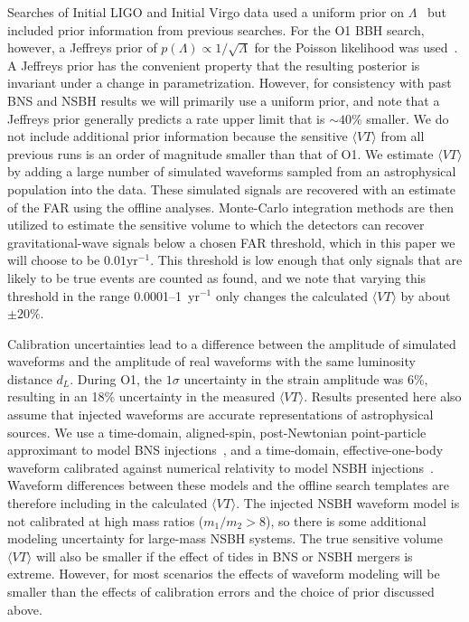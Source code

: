Searches of Initial \ac{LIGO} and Initial Virgo data used a uniform prior on
$\Lambda$~\citep{Colaboration:2011np} but included prior information from previous searches. 
For the \ac{O1} \ac{BBH} search, however, a Jeffreys prior of
$p(\Lambda) \propto 1/\sqrt{\Lambda}$ for the Poisson likelihood was used~\citep{Farr:2013yna,Abbott:2016nhf,TheLIGOScientific:2016pea}.
A Jeffreys prior has the convenient property that the resulting posterior is invariant under a change in parametrization. 
However, for consistency with past BNS and NSBH results we will primarily use a uniform prior, and note that a Jeffreys
prior generally predicts a rate upper limit that is $\sim 40$\% smaller. 
We do not include additional prior information because the sensitive $\langle VT \rangle$ from 
all previous runs is an order of magnitude smaller than that of \ac{O1}.
We estimate $\langle VT \rangle$ by adding a large number of
simulated waveforms sampled from an astrophysical population into the data. 
These simulated signals
are recovered with an estimate of the FAR using the offline analyses.
Monte-Carlo integration methods are then utilized to estimate
the sensitive volume to which the detectors can recover gravitational-wave signals
below a chosen FAR threshold, which in this paper we will choose to be $0.01 \mathrm{yr}^{-1}$.
This threshold is low enough that only signals that are likely to be true events are counted as found, and we 
note that varying this threshold in the range 0.0001--1~yr$^{-1}$ only changes the calculated $\langle VT \rangle$ 
by about $\pm 20\%$.

Calibration uncertainties lead to a difference between the amplitude of simulated
waveforms and the amplitude of real waveforms with the same luminosity distance $d_L$.
During \ac{O1}, the $1\sigma$ uncertainty in the strain amplitude was 6\%, resulting
in an 18\% uncertainty in the measured $\langle VT \rangle$. Results presented here
also assume that injected waveforms are accurate
representations of astrophysical sources. We use a time-domain, aligned-spin,
post-Newtonian point-particle approximant to model \ac{BNS}
injections~\citep{Buonanno:2009zt}, and a time-domain, effective-one-body waveform
calibrated against numerical relativity to model \ac{NSBH}
injections~\citep{Pan:2013rra,Taracchini:2013rva}. Waveform differences between these models and
the offline search templates are therefore including in the calculated $\langle VT \rangle$. 
The injected NSBH waveform model is not calibrated at high mass ratios
($m_1/m_2 >8$), so there is some additional modeling uncertainty for large-mass NSBH
systems. The true sensitive volume $\langle VT \rangle$  will also be smaller if the effect of
tides in \ac{BNS} or \ac{NSBH} mergers is extreme. However, for most scenarios
the effects of waveform modeling will be smaller than the
effects of calibration errors and the choice of prior discussed above. 

